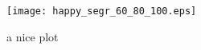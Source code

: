 \documentclass{article}
\begin{document}
\begin{figure}[h]
    \centering
    \texttt{[image: happy\_segr\_60\_80\_100.eps]}
    \caption{a nice plot}
    \label{fig:mesh1}
\end{figure}
\end{document}
